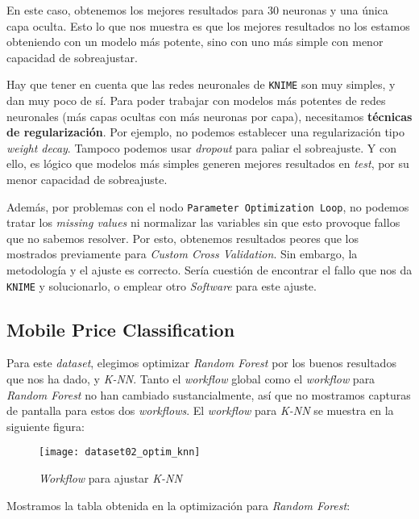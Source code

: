 \documentclass[11pt]{article}
\begin{document}
En este caso, obtenemos los mejores resultados para 30 neuronas y una única capa oculta. Esto lo que nos muestra es que los mejores resultados no los estamos obteniendo con un modelo más potente, sino con uno más simple con menor capacidad de sobreajustar.

Hay que tener en cuenta que las redes neuronales de \lstinline{KNIME} son muy simples, y dan muy poco de sí. Para poder trabajar con modelos más potentes de redes neuronales (más capas ocultas con más neuronas por capa), necesitamos \textbf{técnicas de regularización}. Por ejemplo, no podemos establecer una regularización tipo \emph{weight decay}. Tampoco podemos usar \emph{dropout} para paliar el sobreajuste. Y con ello, es lógico que modelos más simples generen mejores resultados en \emph{test}, por su menor capacidad de sobreajuste.

Además, por problemas con el nodo \lstinline{Parameter Optimization Loop}, no podemos tratar los \emph{missing values} ni normalizar las variables sin que esto provoque fallos que no sabemos resolver. Por esto, obtenemos resultados peores que los mostrados previamente para \emph{Custom Cross Validation}. Sin embargo, la metodología y el ajuste es correcto. Sería cuestión de encontrar el fallo que nos da \lstinline{KNIME} y solucionarlo, o emplear otro \emph{Software} para este ajuste.

\pagebreak

\subsection{Mobile Price Classification}

Para este \emph{dataset}, elegimos optimizar \emph{Random Forest} por los buenos resultados que nos ha dado, y \emph{K-NN}. Tanto el \emph{workflow} global como el \emph{workflow} para \emph{Random Forest} no han cambiado sustancialmente, así que no mostramos capturas de pantalla para estos dos \emph{workflows}. El \emph{workflow} para \emph{K-NN} se muestra en la siguiente figura:

\begin{figure}[H]
    \centering
    \texttt{[image: dataset02\_optim\_knn]}
    \caption{\emph{Workflow} para ajustar \emph{K-NN}}
\end{figure}

Mostramos la tabla obtenida en la optimización para \emph{Random Forest}:
\end{document}
